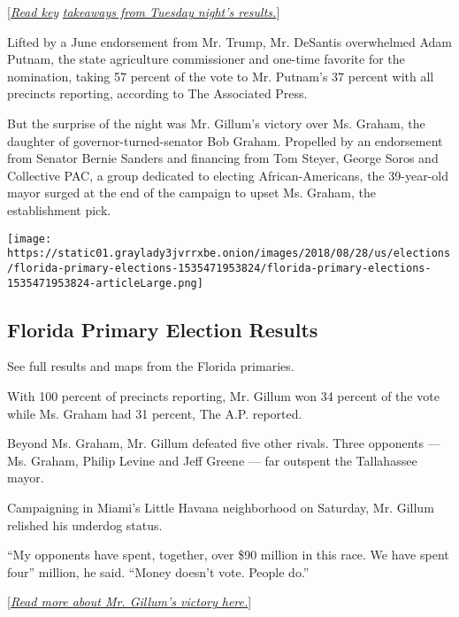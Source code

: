 {[}\href{https://www.nytimes3xbfgragh.onion/2018/08/29/us/politics/arizona-florida-election.html}{\emph{Read
ke}}\emph{y}
\href{https://www.nytimes3xbfgragh.onion/2018/08/29/us/politics/arizona-florida-election.html}{\emph{takeaways
from Tuesday night's results.}}{]}

Lifted by a June endorsement from Mr. Trump, Mr. DeSantis overwhelmed
Adam Putnam, the state agriculture commissioner and one-time favorite
for the nomination, taking 57 percent of the vote to Mr. Putnam's 37
percent with all precincts reporting, according to The Associated Press.

But the surprise of the night was Mr. Gillum's victory over Ms. Graham,
the daughter of governor-turned-senator Bob Graham. Propelled by an
endorsement from Senator Bernie Sanders and financing from Tom Steyer,
George Soros and Collective PAC, a group dedicated to electing
African-Americans, the 39-year-old mayor surged at the end of the
campaign to upset Ms. Graham, the establishment pick.

\href{https://www.nytimes3xbfgragh.onion/interactive/2018/08/28/us/elections/florida-primary-elections.html}{}

\texttt{[image: https://static01.graylady3jvrrxbe.onion/images/2018/08/28/us/elections/florida-primary-elections-1535471953824/florida-primary-elections-1535471953824-articleLarge.png]}

\hypertarget{florida-primary-election-results}{%
\subsection{Florida Primary Election
Results}\label{florida-primary-election-results}}

See full results and maps from the Florida primaries.

With 100 percent of precincts reporting, Mr. Gillum won 34 percent of
the vote while Ms. Graham had 31 percent, The A.P. reported.

Beyond Ms. Graham, Mr. Gillum defeated five other rivals. Three
opponents --- Ms. Graham, Philip Levine and Jeff Greene --- far outspent
the Tallahassee mayor.

Campaigning in Miami's Little Havana neighborhood on Saturday, Mr.
Gillum relished his underdog status.

``My opponents have spent, together, over \$90 million in this race. We
have spent four'' million, he said. ``Money doesn't vote. People do.''

{[}\emph{\href{https://www.nytimes3xbfgragh.onion/2018/08/28/us/politics/andrew-gillum-florida.html}{Read
more about Mr. Gillum's victory here.}}{]}

